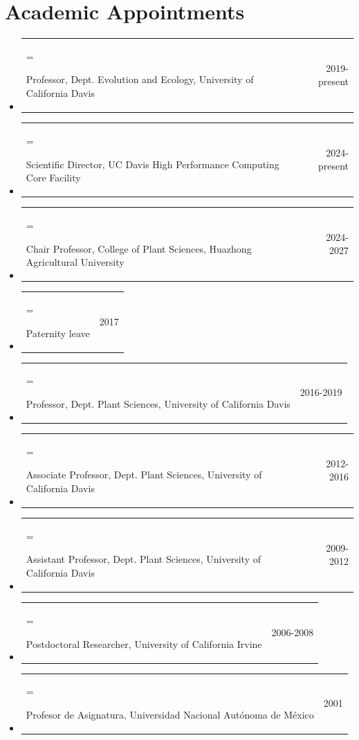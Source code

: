\documentclass[letterpaper,10pt]{article}
\makeatletter
\newlength{\cvhang}\setlength{\cvhang}{1.5em}
\newcommand{\cvitem}[3][\cvhang]{%
  \item\begin{tabularx}{\dimexpr\linewidth+\cvhang\relax}{@{}>{\hangindent=#1\hangafter=1\raggedright\arraybackslash}X@{\hspace{1.5em}}r@{}}
    #2 & #3
  \end{tabularx}%
}
\makeatother
\begin{document}
\section*{Academic Appointments}
\begin{itemize}
\cvitem{Professor, Dept. Evolution and Ecology, University of California Davis}{2019-present}
\cvitem{Scientific Director, UC Davis High Performance Computing Core Facility}{2024-present}
\cvitem{Chair Professor, College of Plant Sciences, Huazhong Agricultural University}{2024-2027}
\cvitem{Paternity leave}{2017}
\cvitem{Professor, Dept. Plant Sciences, University of California Davis}{2016-2019}
\cvitem{Associate Professor, Dept. Plant Sciences, University of California Davis}{2012-2016}
\cvitem{Assistant Professor, Dept. Plant Sciences, University of California Davis}{2009-2012}
\cvitem{Postdoctoral Researcher, University of California Irvine}{2006-2008}
\cvitem{Profesor de Asignatura, Universidad Nacional Aut\'{o}noma de M\'{e}xico}{2001}
\end{itemize}

\end{document}
